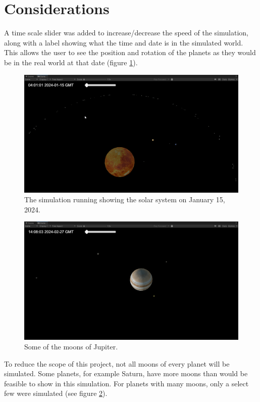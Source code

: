 \documentclass{article}
\begin{document}
    \section{Considerations}
    A time scale slider was added to increase/decrease the speed of the simulation, along with a label showing what the time and date is in the simulated world. This allows the user to see the position and rotation of the planets as they would be in the real world at that date (figure \ref{date}).
    \begin{figure}[h]
        \centering
        \includegraphics[scale=0.25]{date_time.png}
        \caption{The simulation running showing the solar system on January 15, 2024.}
        \label{date}
    \end{figure}
    \begin{figure}[h]
        \centering
        \includegraphics[scale=0.25]{jupiter.png}
        \caption{Some of the moons of Jupiter.}
        \label{jupiter}
    \end{figure}
    
    To reduce the scope of this project, not all moons of every planet will be simulated. Some planets, for example Saturn, have more moons than would be feasible to show in this simulation. For planets with many moons, only a select few were simulated (see figure \ref{jupiter}).
\end{document}
